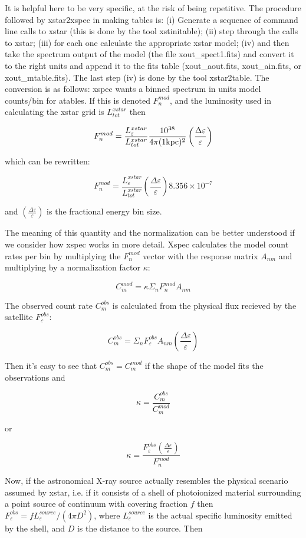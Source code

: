 It is helpful here to be very specific, at the risk of being repetitive.
The procedure followed by xstar2xspec in making tables is:  (i) Generate 
a sequence of command line calls to xstar (this is done by the tool xstinitable);
(ii) step through the calls to xstar; (iii) for each one calculate the appropriate 
xstar model; (iv) and then  take the spectrum output of the model (the file xout\_spect1.fits) and 
convert it to the right units and append it to the fits table (xout\_aout.fits, xout\_ain.fits,
or xout\_mtable.fits).  The last step (iv) is done by the tool xstar2table.  The conversion 
is as follows:  xspec wants a binned spectrum in units model counts/bin for atables.
If this is denoted $F_n^{mod}$, and the luminosity used in calculating the xstar grid is $L_{tot}^{xstar}$
then

$$F_n^{mod}=\frac{L_\varepsilon^{xstar}}{L_{tot}^{xstar}} \frac{10^{38}}{4 \pi (1 {\rm kpc})^2} \left(\frac{\Delta\varepsilon}{\varepsilon}\right)$$

which can be rewritten:

$$F_n^{mod}=\frac{L_\varepsilon^{xstar}}{L_{tot}^{xstar}} \left(\frac{\Delta\varepsilon}{\varepsilon}\right) 8.356 \times 10^{-7}$$

and $\left(\frac{\Delta\varepsilon}{\varepsilon}\right)$ is the fractional energy bin size.  

The meaning of this quantity and the normalization can be better understood if we consider how 
xspec works in more detail.  Xspec calculates the model count rates per bin by multiplying the 
$F_n^{mod}$ vector with the response matrix $A_{nm}$ and multiplying by a normalization factor $\kappa$:

$$C_m^{mod}=\kappa \Sigma_n{F_n^{mod} A_{nm}}$$

\noindent The observed count rate $C_m^{obs}$ is calculated from the physical flux recieved by the 
satellite $F_\varepsilon^{obs}$:

$$C_m^{obs}=\Sigma_n{F_\varepsilon^{obs} A_{nm}}\left(\frac{\Delta\varepsilon}{\varepsilon}\right)$$

\noindent Then it's easy to see that $C_m^{obs}=C_m^{mod}$ if the shape of the model fits the observations and

$$\kappa = \frac{C_m^{obs}}{C_m^{mod}}$$

or

$$\kappa=\frac{F_\varepsilon^{obs} \left(\frac{\Delta\varepsilon}{\varepsilon}\right)}{F_n^{mod}}$$

Now, if the astronomical X-ray source actually resembles the physical scenario assumed by xstar, i.e. if it 
consists of a shell of photoionized material surrounding
a point source of continuum with covering fraction $f$  then $F_\varepsilon^{obs}=f L_\varepsilon^{source}/(4\pi D^2)$, where 
$L_\varepsilon^{source}$ is the actual specific luminosity emitted by the shell, and $D$ is the distance 
to the source.  Then

